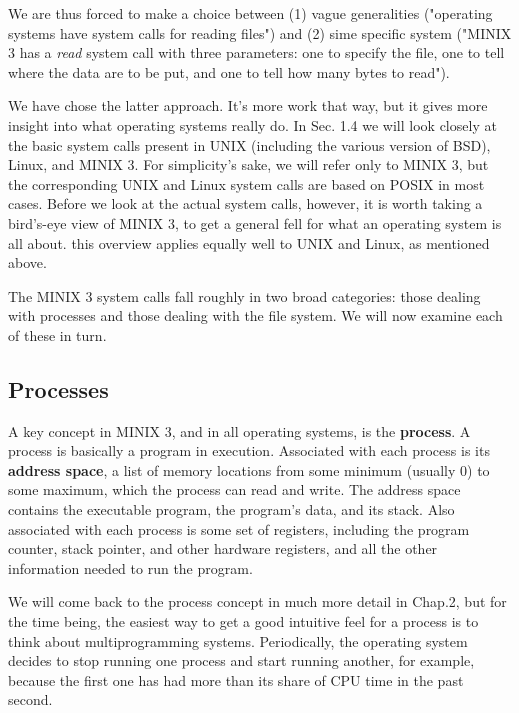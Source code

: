 \documentclass{book}
\newcommand {\kw}  [1] {\textbf{#1}}
\newcommand {\cmd} [1] {\textsl{#1}}
\begin{document}
We are thus forced to make a choice between (1) vague generalities ("operating systems have system calls for reading files")
and (2) sime specific system ("MINIX 3 has a \cmd{read} system call with three parameters: 
one to specify the file, one to tell where the data are to be put, and one to tell how many bytes to read").

We have chose the latter approach.
It's more work that way, but it gives more insight into what operating systems really do.
In Sec. 1.4 we will look closely at the basic system calls present in UNIX (including the various version of BSD), Linux, and MINIX 3.
For simplicity's sake, we will refer only to MINIX 3, but the corresponding UNIX and Linux system calls are based on POSIX in most cases.
Before we look at the actual system calls, however, it is worth taking a bird's-eye view of MINIX 3, 
to get a general fell for what an operating system is all about.
this overview applies equally well to UNIX and Linux, as mentioned above.

The MINIX 3 system calls fall roughly in two broad categories: those dealing with processes and those dealing with the file system.
We will now examine each of these in turn.

\subsection{Processes}
A key concept in MINIX 3, and in all operating systems, is the \kw{process}.
A process is basically a program in execution.
Associated with each process is its \kw{address space}, a list of memory locations from some minimum (usually 0) to some maximum,
which the process can read and write.
The address space contains the executable program, the program's data, and its stack.
Also associated with each process is some set of registers, including the program counter, stack pointer, and other hardware registers, 
and all the other information needed to run the program.
 
We will come back to the process concept in much more detail in Chap.2, but for the time being, 
the easiest way to get a good intuitive feel for a process is to think about multiprogramming systems.
Periodically, the operating system decides to stop running one process and start running another, for example, 
because the first one has had more than its share of CPU time in the past second.













\end{document}
